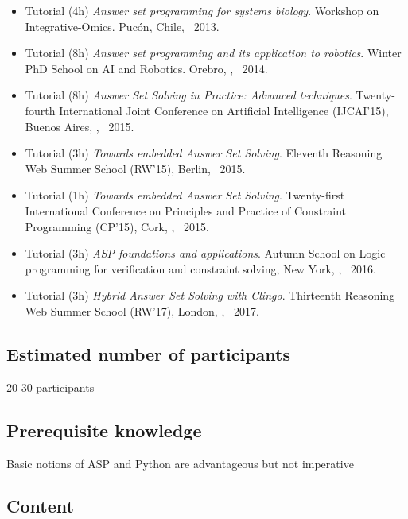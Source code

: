 \documentclass{article}
\begin{document}
\begin{itemize}
\item Tutorial (4h)
  \emph{Answer set programming for systems biology}.
  Workshop on Integrative-Omics.
  Pucón, Chile,
  \DEC\ 2013.

\item Tutorial (8h)
  \emph{Answer set programming  and its application to robotics}.
  Winter PhD School on AI and Robotics.
  Orebro, \SWEDEN,
  \DEC\ 2014.

\item Tutorial (8h)
  \emph{Answer Set Solving in Practice: Advanced techniques}.
  Twenty-fourth International Joint Conference on Artificial Intelligence (IJCAI'15),
  Buenos Aires, \ARGENTINA,
  \JUL\ 2015.

\item Tutorial (3h)
  \emph{Towards embedded Answer Set Solving}.
  Eleventh Reasoning Web Summer School (RW'15),
  Berlin\xGERMANY,
  \AUG\ 2015.

\item Tutorial (1h)
  \emph{Towards embedded Answer Set Solving}.
  Twenty-first International Conference on Principles and Practice of Constraint Programming (CP'15),
  Cork, \IRELAND,
  \SEP\ 2015.

\item Tutorial (3h)
  \emph{ASP foundations and applications}.
  Autumn School on
  Logic programming for verification and constraint solving,
  New York, \USA,
  \OCT\ 2016.

\item Tutorial (3h)
  \emph{Hybrid Answer Set Solving with Clingo}.
  Thirteenth Reasoning Web Summer School (RW'17),
  London, \UK,
  \JUL\ 2017.
\end{itemize}

\subsection*{Estimated number of participants} 20-30 participants

\subsection*{Prerequisite knowledge} Basic notions of ASP and Python are advantageous but not imperative

\subsection*{Content}
\end{document}

